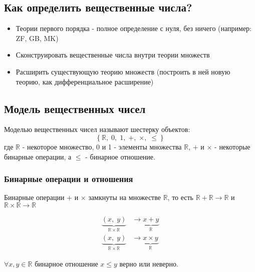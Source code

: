\documentclass[class=article,a4paper,12pt,crop=false]{standalone}
\begin{document}
  \subsection{Как определить вещественные числа?}

  \begin{itemize}
    \item {
      Теории первого порядка -
      полное определение с нуля, без ничего (например: ZF, GB, MK)
    }
    \item {
      Сконструировать вещественные числа внутри теории множеств
    }
    \item {
      Расширить существующую теорию множеств
      (построить в ней новую теорию, как дифференциальное расширение)
    }
  \end{itemize}

  \subsection{Модель вещественных чисел}

  Моделью вещественных чисел называют шестерку объектов: \[
    \left\{ \mathbb{R}, \; 0, \;  1, \;  +, \;  \times, \;  \leq \right\} 
  \] где $\mathbb{R}$ - некоторое множество, 0 и 1 - элементы множества
  $\mathbb{R}$, $+$ и $\times$ - некоторые бинарные операции, а $\leq$ - 
  бинарное отношение.

  \subsubsection{Бинарные операции и отношения}

  Бинарные операции $+$ и $\times$ замкнуты на множестве $\mathbb{R}$,
  то есть $\mathbb{R} + \mathbb{R} \rightarrow \mathbb{R}$ и
  $\mathbb{R} \times \mathbb{R} \rightarrow \mathbb{R}$

  \begin{equation}
    \begin{aligned}
      \underbrace{\left(x, \; y \right)}_{\mathbb{R} \times \mathbb{R}} &
      \rightarrow \underbrace{x + y}_{\mathbb{R}} \\
      \underbrace{\left(x, \; y \right)}_{\mathbb{R} \times \mathbb{R}} &
      \rightarrow \underbrace{x \times y}_{\mathbb{R}}
    \end{aligned}
  \end{equation}

  $\forall x,y\in\mathbb{R}$ бинарное отношение $x \leq y$ верно или неверно.
\end{document}
